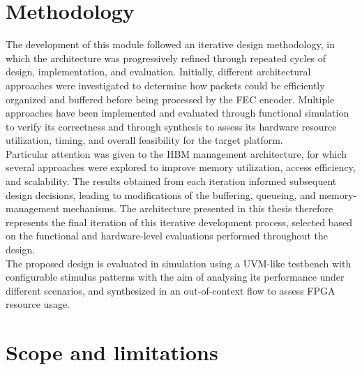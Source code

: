 
%

\section{Methodology}
The development of this module followed an iterative design methodology, in which the architecture was progressively refined through repeated 
cycles of design, implementation, and evaluation. Initially, different architectural approaches were investigated to determine how packets could 
be efficiently organized and buffered before being processed by the FEC encoder. Multiple approaches have been implemented and evaluated through 
functional simulation to verify its correctness and through synthesis to assess its hardware resource utilization, timing, and overall 
feasibility for the target platform.\\

Particular attention was given to the HBM management architecture, for which several approaches were 
explored to improve memory utilization, access efficiency, and scalability. The results obtained from each iteration informed subsequent 
design decisions, leading to modifications of the buffering, queueing, and memory-management mechanisms. The architecture presented in this 
thesis therefore represents the final iteration of this iterative development process, selected based on the functional and hardware-level 
evaluations performed throughout the design. \\

The proposed design is evaluated in simulation using a UVM-like testbench with configurable stimulus patterns with the aim of analysing its 
performance under different scenarios, and synthesized in an out-of-context flow to assess FPGA resource usage.

\section{Scope and limitations}

